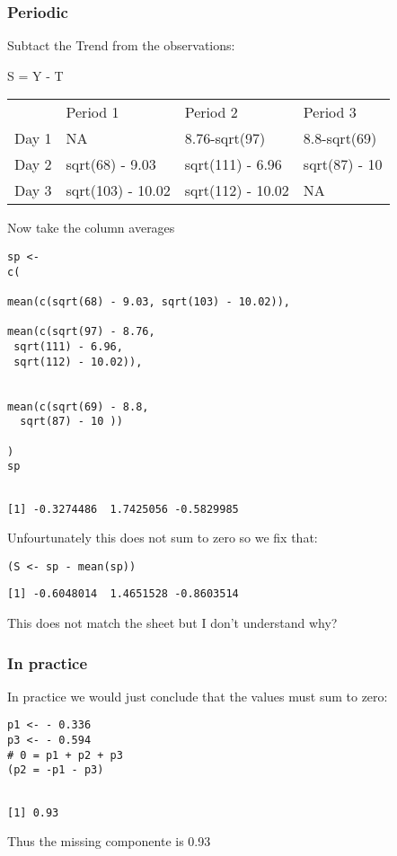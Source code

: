\documentclass[11pt]{article}
\begin{document}
\subsubsection{Periodic}
\label{sec:org74de3d6}

Subtact the Trend from the observations:



S = Y - T


\begin{center}
\begin{tabular}{llll}
 & Period 1 & Period 2 & Period 3\\
Day 1 & NA & 8.76-sqrt(97) & 8.8-sqrt(69)\\
Day 2 & sqrt(68) - 9.03 & sqrt(111) - 6.96 & sqrt(87) - 10\\
Day 3 & sqrt(103) - 10.02 & sqrt(112) - 10.02 & NA\\
\end{tabular}
\end{center}


Now take the column averages

\begin{verbatim}
sp <-
c(

mean(c(sqrt(68) - 9.03, sqrt(103) - 10.02)),

mean(c(sqrt(97) - 8.76,
 sqrt(111) - 6.96,
 sqrt(112) - 10.02)),


mean(c(sqrt(69) - 8.8,
  sqrt(87) - 10 ))

)
sp
\end{verbatim}

\begin{verbatim}

[1] -0.3274486  1.7425056 -0.5829985
\end{verbatim}


Unfourtunately this does not sum to zero so we fix that:

\begin{verbatim}
(S <- sp - mean(sp))
\end{verbatim}

\begin{verbatim}
[1] -0.6048014  1.4651528 -0.8603514
\end{verbatim}


This does not match the sheet but I don't understand why?

\subsubsection{In practice}
\label{sec:org1f93cb7}
In practice we would just conclude that the values must sum to zero:

\begin{verbatim}
p1 <- - 0.336
p3 <- - 0.594
# 0 = p1 + p2 + p3
(p2 = -p1 - p3)
\end{verbatim}

\begin{verbatim}

[1] 0.93
\end{verbatim}


Thus the missing componente is 0.93
\end{document}
